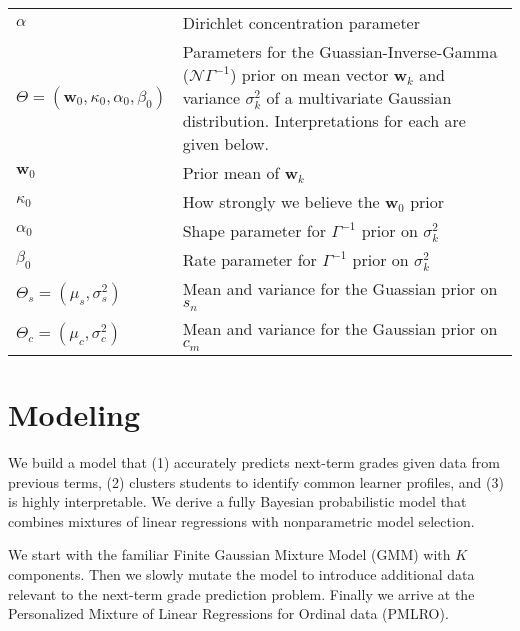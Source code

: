 \documentclass[10pt]{proc}
\begin{document}
{\footnotesize
\begin{tabular}{p{} p{}}
    $\alpha$                    &   Dirichlet concentration parameter           \\
    $\Theta= (\bm{w}_0, \kappa_0, \alpha_0, \beta_0)$
                    &   Parameters for the Guassian-Inverse-Gamma
                        ($\mathcal{N}\Gamma^{-1}$) prior on mean vector $\bm{w}_k$ and
                        variance $\sigma_k^2$ of a multivariate Gaussian distribution.
                        Interpretations for each are given below.               \\
    $\bm{w}_0$      &   Prior mean of $\bm{w}_k$                                \\
    $\kappa_0$      &   How strongly we believe the $\bm{w}_0$ prior            \\
    $\alpha_0$      &   Shape parameter for $\Gamma^{-1}$ prior on $\sigma_k^2$ \\
    $\beta_0$       &   Rate parameter for $\Gamma^{-1}$ prior on $\sigma_k^2$  \\
    $\Theta_s = (\mu_s, \sigma_s^2)$
                    &   Mean and variance for the Guassian prior on $s_n$       \\
    $\Theta_c = (\mu_c, \sigma_c^2)$
                    &   Mean and variance for the Gaussian prior on $c_m$       \\
\end{tabular}}


\section{Modeling}\label{model}

We build a model that (1) accurately predicts next-term grades given data from
previous terms, (2) clusters students to identify common learner profiles, and
(3) is highly interpretable. We derive a fully Bayesian probabilistic model that
combines mixtures of linear regressions with nonparametric model selection.

We start with the familiar Finite Gaussian Mixture Model (GMM) with $K$
components. Then we slowly mutate the model to introduce additional data
relevant to the next-term grade prediction problem. Finally we arrive at the
Personalized Mixture of Linear Regressions for Ordinal data (PMLRO).
\end{document}
